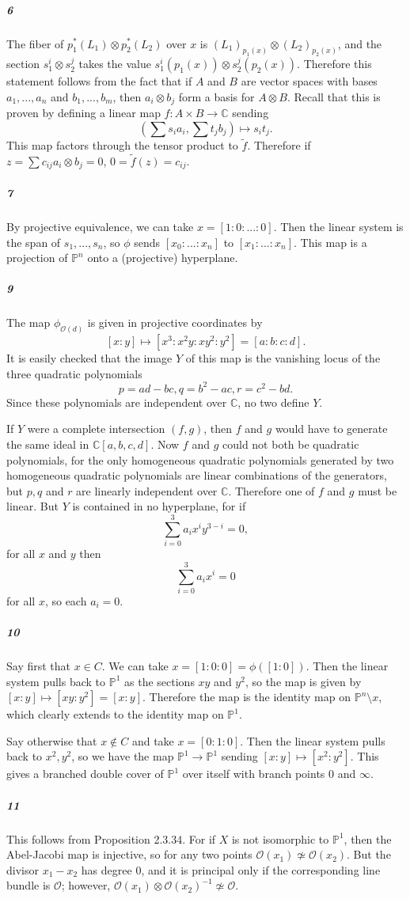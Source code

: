 \documentclass[10pt,letter]{article}
\begin{document}
\subparagraph{6} The fiber of $p_1^\ast(L_1) \otimes p_2^\ast(L_2)$ over $x$ is $(L_1)_{p_1(x)} \otimes (L_2)_{p_2(x)}$, and the section $s_1^i \otimes s_2^j$ takes the value $s_1^i(p_1(x)) \otimes s_2^j(p_2(x))$. Therefore this statement follows from the fact that if $A$ and $B$ are vector spaces with bases $a_1,...,a_n$ and $b_1,...,b_m$, then $a_i \otimes b_j$ form a basis for $A \otimes B$. Recall that this is proven by defining a linear map $f: A \times B \rightarrow \mathbb{C}$ sending \[(\sum s_i a_i, \sum t_j b_j) \mapsto s_i t_j.\] This map factors through the tensor product to $\tilde{f}$. Therefore if $z = \sum c_{ij} a_i \otimes b_j = 0$,  $0 = \tilde{f}(z) = c_{ij}$. 

\subparagraph{7} By projective equivalence, we can take $x = [1:0:...:0]$. Then the linear system is the span of $s_1,...,s_n$, so $\phi$ sends $[x_0:...:x_n]$ to $[x_1:...:x_n]$. This map is a projection of $\mathbb{P}^n$ onto a (projective) hyperplane. 

\subparagraph{9} The map $\phi_{\mathcal{O}(d)}$ is given in projective coordinates by 
\[ [x:y] \mapsto [x^3:x^2y:xy^2:y^2] = [a:b:c:d].\]
It is easily checked that the image $Y$ of this map is the vanishing locus of the three quadratic polynomials
\[ p = ad-bc, q = b^2-ac, r = c^2-bd.\]
Since these polynomials are independent over $\mathbb{C}$, no two define $Y$.

 
If $Y$ were a complete intersection $(f,g)$, then $f$ and $g$ would have to generate the same ideal in $\mathbb{C}[a,b,c,d]$. Now $f$ and $g$ could not both be quadratic polynomials, for the only homogeneous quadratic polynomials generated by two homogeneous quadratic polynomials are linear combinations of the generators, but $p,q$ and $r$ are linearly independent over $\mathbb{C}$. Therefore one of $f$ and $g$ must be linear. But $Y$ is contained in no hyperplane, for if 
\[ \sum_{i=0}^3 a_i x^iy^{3-i} = 0,\]
for all $x$ and $y$ then \[ \sum_{i=0}^3 a_i x^i = 0\] for all $x$, so each $a_i = 0$. 

\subparagraph{10} Say first that $x \in C$. We can take $x = [1:0:0] = \phi([1:0])$. Then the linear system pulls back to $\mathbb{P}^1$ as the sections $xy$ and $y^2$, so the map is given by $[x:y] \mapsto [xy:y^2] = [x:y]$. Therefore the map is the identity map on $\mathbb{P}^n \setminus x$, which clearly extends to the identity map on $\mathbb{P}^1$. 

Say otherwise that $x \not \in C$ and take $x = [0:1:0]$. Then the linear system pulls back to $x^2, y^2$, so we have the map $\mathbb{P}^1 \rightarrow \mathbb{P}^1$ sending $[x:y] \mapsto [x^2:y^2]$. This gives a branched double cover of $\mathbb{P}^1$ over itself with branch points $0$ and $\infty$. 

\subparagraph{11} This follows from Proposition 2.3.34. For if $X$ is not isomorphic to $\mathbb{P}^1$, then the Abel-Jacobi map is injective, so for any two points $\mathcal{O}(x_1) \not \simeq \mathcal{O}(x_2)$. But the divisor $x_1 - x_2$ has degree $0$, and it is principal only if the corresponding line bundle is $\mathcal{O}$; however, $\mathcal{O}(x_1) \otimes \mathcal{O}(x_2)^{-1} \not \simeq \mathcal{O}$. 
\end{document}

